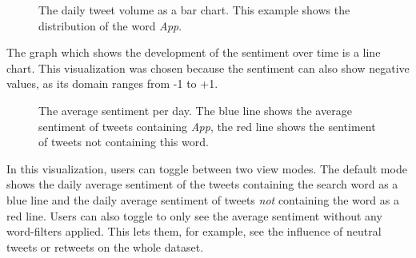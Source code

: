 \begin{figure}[h!tb]
    \caption{The daily tweet volume as a bar chart. This example shows the distribution of the word \emph{App}.}
    \label{fig:volume_barchart}
\end{figure}


The graph which shows the development of the sentiment over time is a line chart. This visualization was chosen because the sentiment can also show negative values, as its domain ranges from -1 to +1. %

\begin{figure}[h!tb]
    \caption{The average sentiment per day. The blue line shows the average sentiment of tweets containing \emph{App}, the red line shows the sentiment of tweets not containing this word.}
    \label{fig:sentiment_linechart}
\end{figure}

In this visualization, users can toggle between two view modes. The default mode shows the daily average sentiment of the tweets containing the search word as a blue line and the daily average sentiment of tweets \emph{not} containing the word as a red line. Users can also toggle to only see the average sentiment without any word-filters applied. This lets them, for example, see the influence of neutral tweets or retweets on the whole dataset.

